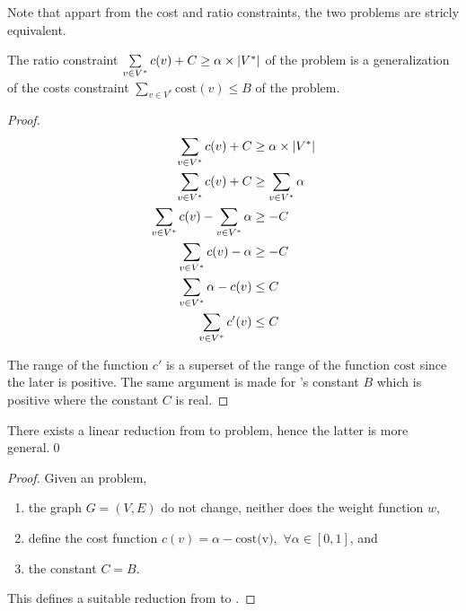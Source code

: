 		Note that appart from the cost and ratio constraints, the two problems are stricly equivalent.

		\begin{proposition}
			The ratio constraint $\sum\limits_{v \in V^*}{c(v)} + C \geq \alpha\times\lvert V^*\rvert$ of the \rbmwcs{} problem is a generalization of the costs constraint $\sum\limits_{v \in V^*}{\text{cost}(v)} \leq B$ of the \bcmwcs{} problem.
		\end{proposition}

		\begin{proof}
			\begin{align*}
				\sum\limits_{v \in V^*}{c(v)} + C &\geq \alpha\times\lvert V^*\rvert \\
				\sum\limits_{v \in V^*}{c(v)} + C &\geq \sum\limits_{v \in V^*}{\alpha} \\
				\sum\limits_{v \in V^*}{c(v)} - \sum\limits_{v \in V^*}{\alpha} &\geq -C \\
				\sum\limits_{v \in V^*}{c(v) - \alpha} &\geq -C \\
				\sum\limits_{v \in V^*}{\alpha - c(v)} &\leq C \\
				\sum\limits_{v \in V^*}{c'(v)} &\leq C \\
			\end{align*}

			The range of the function $c'$ is a superset of the range of the function $\text{cost}$ since the later is positive.
			The same argument is made for \bcmwcs{}'s constant $B$ which is positive where the constant $C$ is real.
		\end{proof}

		\begin{proposition}
			There exists a linear reduction from \bcmwcs{} to \rbmwcs{} problem, hence the latter is more general.\qed{}
		\end{proposition}

		\begin{proof}
			Given an \bcmwcs{} problem,
			\begin{enumerate}
				\item the graph $G = (V, E)$ do not change, neither does the weight function $w$,
				\item define the cost function $c(v) = \alpha - \text{cost(v)},\,\,\forall \alpha \in [0,1]$, and
				\item the constant $C = B$.
			\end{enumerate}
			This defines a suitable reduction from \bcmwcs{} to \rbmwcs{}.
		\end{proof}


